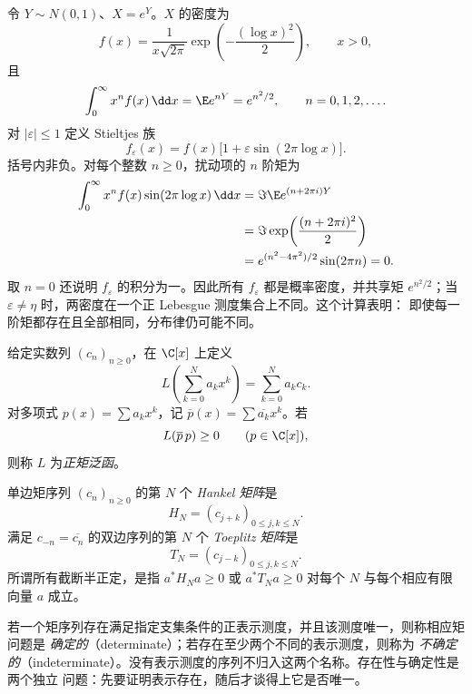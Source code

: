 \begin{example}[对数正态不定矩]\label{ex:7-3-1-3}
令 $Y\sim N(0,1)$、$X=e^Y$。$X$ 的密度为
\[
 f(x)=\frac{1}{x\sqrt{2\pi}}
      \exp\!\left(-\frac{(\log x)^2}{2}\right),\qquad x>0,
\]
且
\[
 \int_0^\infty x^n f(x)\,\dd x=\E e^{nY}=e^{n^2/2},
 \qquad n=0,1,2,\ldots.
\]
对 $|\varepsilon|\leq1$ 定义 Stieltjes 族
\[
 f_\varepsilon(x)=f(x)\bigl[1+\varepsilon\sin(2\pi\log x)\bigr].
\]
括号内非负。对每个整数 $n\geq0$，扰动项的 $n$ 阶矩为
\begin{align*}
 \int_0^\infty x^nf(x)\sin(2\pi\log x)\,\dd x
 &=\Im\E e^{(n+2\pi i)Y}\\
 &=\Im\exp\!\left(\frac{(n+2\pi i)^2}{2}\right)\\
 &=e^{(n^2-4\pi^2)/2}\sin(2\pi n)=0.
\end{align*}
取 $n=0$ 还说明 $f_\varepsilon$ 的积分为一。因此所有 $f_\varepsilon$ 都是概率密度，并共享矩
$e^{n^2/2}$；当 $\varepsilon\neq\eta$ 时，两密度在一个正 Lebesgue 测度集合上不同。这个计算表明：
即使每一阶矩都存在且全部相同，分布律仍可能不同。
\end{example}

\begin{definition}[矩泛函]\label{def:7-3-1-1}
给定实数列 $(c_n)_{n\geq0}$，在 $\C[x]$ 上定义
\[
 L\!\left(\sum_{k=0}^N a_kx^k\right)=\sum_{k=0}^Na_kc_k.
\]
对多项式 $p(x)=\sum a_kx^k$，记
$\overline p(x)=\sum\overline{a_k}x^k$。若
\[
 L(\overline p\,p)\geq0\qquad(p\in\C[x]),
\]
则称 $L$ 为\emph{正矩泛函}。
\end{definition}

\begin{definition}\label{def:7-3-1-2}
单边矩序列 $(c_n)_{n\geq0}$ 的第 $N$ 个 \emph{Hankel 矩阵}是
\[
 H_N=(c_{j+k})_{0\leq j,k\leq N}.
\]
满足 $c_{-n}=\overline{c_n}$ 的双边序列的第 $N$ 个 \emph{Toeplitz 矩阵}是
\[
 T_N=(c_{j-k})_{0\leq j,k\leq N}.
\]
所谓所有截断半正定，是指 $a^*H_Na\geq0$ 或 $a^*T_Na\geq0$ 对每个 $N$ 与每个相应有限向量
$a$ 成立。
\end{definition}

\begin{definition}[确定与不确定矩问题]\label{def:7-3-1-3}
若一个矩序列存在满足指定支集条件的正表示测度，并且该测度唯一，则称相应矩问题是
\emph{确定的}（determinate）；若存在至少两个不同的表示测度，则称为
\emph{不确定的}（indeterminate）。没有表示测度的序列不归入这两个名称。存在性与确定性是两个独立
问题：先要证明表示存在，随后才谈得上它是否唯一。
\end{definition}

